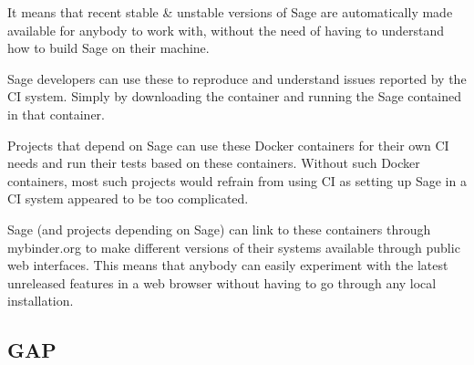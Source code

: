 \documentclass{deliverablereport}
\begin{document}
It means that recent stable \& unstable versions of Sage are automatically made
available for anybody to work with, without the need of having to understand
how to build Sage on their machine.

Sage developers can use these to reproduce and understand issues
reported by the CI system. Simply by downloading the container and running the
Sage contained in that container.

Projects that depend on Sage can use these Docker containers for their own CI
needs and run their tests based on these containers. Without such Docker
containers, most such projects would refrain from using CI as setting up Sage
in a CI system appeared to be too complicated.

Sage (and projects depending on Sage) can link to these containers through
mybinder.org  to make
different versions of their systems available through public web interfaces.
This means that anybody can easily experiment with the latest unreleased
features in a web browser without having to go through any local installation.

\subsection{GAP}

% 
\end{document}
